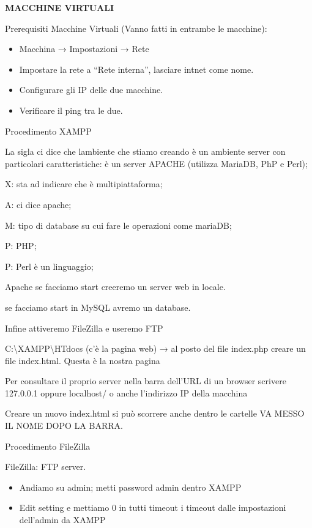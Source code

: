\textbf{MACCHINE VIRTUALI}

Prerequisiti Macchine Virtuali (Vanno fatti in entrambe le macchine):

\begin{itemize}
\item
  Macchina → Impostazioni → Rete
\item
  Impostare la rete a ``Rete interna'', lasciare intnet come nome.
\item
  Configurare gli IP delle due macchine.
\item
  Verificare il ping tra le due.
\end{itemize}

Procedimento XAMPP

La sigla ci dice che l\textquotesingle ambiente che stiamo creando è un
ambiente server con particolari caratteristiche: è un server APACHE
(utilizza MariaDB, PhP e Perl);

X: sta ad indicare che è multipiattaforma;

A: ci dice apache;

M: tipo di database su cui fare le operazioni come mariaDB;

P: PHP;

P: Perl è un linguaggio;

Apache se facciamo start creeremo un server web in locale.

se facciamo start in MySQL avremo un database.

Infine attiveremo FileZilla e useremo FTP

C:\textbackslash XAMPP\textbackslash HTdocs (c'è la pagina web) → al
posto del file index.php creare un file index.html. Questa è la nostra
pagina

Per consultare il proprio server nella barra dell'URL di un browser
scrivere 127.0.0.1 oppure localhost/ o anche l'indirizzo IP della
macchina

Creare un nuovo index.html si può scorrere anche dentro le cartelle VA
MESSO IL NOME DOPO LA BARRA.

Procedimento FileZilla

FileZilla: FTP server.

\begin{itemize}
\item
  Andiamo su admin; metti password admin dentro XAMPP
\item
  Edit setting e mettiamo 0 in tutti timeout i timeout dalle
  impostazioni dell'admin da XAMPP
\end{itemize}

